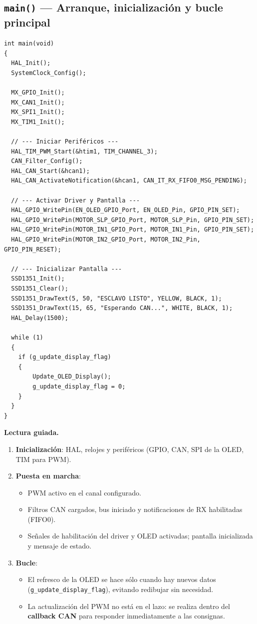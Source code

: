 \documentclass[a4paper,12pt]{article}
\begin{document}
\subsection{\texttt{main()} — Arranque, inicialización y bucle principal}
\begin{lstlisting}
int main(void)
{
  HAL_Init();
  SystemClock_Config();

  MX_GPIO_Init();
  MX_CAN1_Init();
  MX_SPI1_Init();
  MX_TIM1_Init();

  // --- Iniciar Periféricos ---
  HAL_TIM_PWM_Start(&htim1, TIM_CHANNEL_3);
  CAN_Filter_Config();
  HAL_CAN_Start(&hcan1);
  HAL_CAN_ActivateNotification(&hcan1, CAN_IT_RX_FIFO0_MSG_PENDING);

  // --- Activar Driver y Pantalla ---
  HAL_GPIO_WritePin(EN_OLED_GPIO_Port, EN_OLED_Pin, GPIO_PIN_SET);
  HAL_GPIO_WritePin(MOTOR_SLP_GPIO_Port, MOTOR_SLP_Pin, GPIO_PIN_SET);
  HAL_GPIO_WritePin(MOTOR_IN1_GPIO_Port, MOTOR_IN1_Pin, GPIO_PIN_SET);
  HAL_GPIO_WritePin(MOTOR_IN2_GPIO_Port, MOTOR_IN2_Pin, GPIO_PIN_RESET);

  // --- Inicializar Pantalla ---
  SSD1351_Init();
  SSD1351_Clear();
  SSD1351_DrawText(5, 50, "ESCLAVO LISTO", YELLOW, BLACK, 1);
  SSD1351_DrawText(15, 65, "Esperando CAN...", WHITE, BLACK, 1);
  HAL_Delay(1500);

  while (1)
  {
    if (g_update_display_flag)
    {
        Update_OLED_Display();
        g_update_display_flag = 0;
    }
  }
}
\end{lstlisting}

\noindent\textbf{Lectura guiada.}
\begin{enumerate}
  \item \textbf{Inicialización}: HAL, relojes y periféricos (GPIO, CAN, SPI de la OLED, TIM para PWM).
  \item \textbf{Puesta en marcha}:
    \begin{itemize}
      \item PWM activo en el canal configurado.
      \item Filtros CAN cargados, bus iniciado y notificaciones de RX habilitadas (FIFO0).
      \item Señales de habilitación del driver y OLED activadas; pantalla inicializada y mensaje de estado.
    \end{itemize}
  \item \textbf{Bucle}:
    \begin{itemize}
      \item El refresco de la OLED se hace sólo cuando hay nuevos datos (\texttt{g\_update\_display\_flag}), evitando redibujar sin necesidad.
      \item La actualización del PWM no está en el lazo: se realiza dentro del \textbf{callback CAN} para responder inmediatamente a las consignas.
    \end{itemize}
\end{enumerate}
\end{document}
